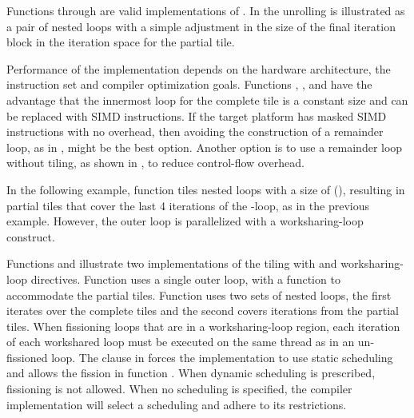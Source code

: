 Functions  through  are valid implementations of .
In  the unrolling is illustrated as a pair of nested loops with a simple
adjustment in the size of the final iteration block in the  iteration space
for the partial tile.

Performance of the implementation depends on the hardware architecture, the instruction set and compiler optimization goals.
Functions , , and  have the advantage that
the innermost loop for the complete tile is a constant size and can be replaced with SIMD instructions.
If the target platform has masked SIMD instructions with no overhead, then avoiding the construction of a
remainder loop, as in , might be the best option.
Another option is to use a remainder loop without tiling, as shown in , to reduce control-flow overhead.



In the following example, function  tiles nested loops with a size of (),
resulting in partial tiles that cover the last 4 iterations of the -loop, as
in the previous example. However, the outer loop is parallelized with a
 worksharing-loop construct.

Functions  and  illustrate two implementations of the tiling
with  and worksharing-loop directives.  Function  uses a single outer loop, with a  function
to accommodate the partial tiles. Function 
uses two sets of nested loops, the first iterates over the complete tiles and the
second covers iterations from the partial tiles. When fissioning loops that
are in a  worksharing-loop region, each iteration of each workshared loop
must be executed on the same thread as in an un-fissioned loop. The  clause in 
forces the implementation to use static scheduling and allows the fission in function .
When dynamic scheduling is prescribed, fissioning is not allowed. When no scheduling is specified,
the compiler implementation will select a scheduling  and adhere to its restrictions.

